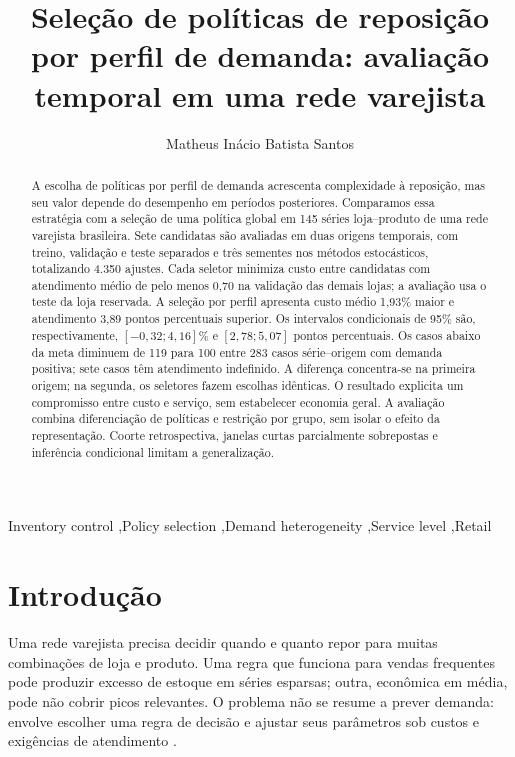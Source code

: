 \documentclass[preprint,12pt]{elsarticle}
\begin{document}
\begin{frontmatter}
\title{Seleção de políticas de reposição por perfil de demanda: avaliação temporal em uma rede varejista}
\author[ufal]{Matheus Inácio Batista Santos}
\begin{abstract}
A escolha de políticas por perfil de demanda acrescenta complexidade à reposição, mas seu valor depende do desempenho em períodos posteriores. Comparamos essa estratégia com a seleção de uma política global em 145 séries loja--produto de uma rede varejista brasileira. Sete candidatas são avaliadas em duas origens temporais, com treino, validação e teste separados e três sementes nos métodos estocásticos, totalizando 4.350 ajustes. Cada seletor minimiza custo entre candidatas com atendimento médio de pelo menos 0,70 na validação das demais lojas; a avaliação usa o teste da loja reservada. A seleção por perfil apresenta custo médio 1,93\% maior e atendimento 3,89 pontos percentuais superior. Os intervalos condicionais de 95\% são, respectivamente, $[-0{,}32;4{,}16]\%$ e $[2{,}78;5{,}07]$ pontos percentuais. Os casos abaixo da meta diminuem de 119 para 100 entre 283 casos série--origem com demanda positiva; sete casos têm atendimento indefinido. A diferença concentra-se na primeira origem; na segunda, os seletores fazem escolhas idênticas. O resultado explicita um compromisso entre custo e serviço, sem estabelecer economia geral. A avaliação combina diferenciação de políticas e restrição por grupo, sem isolar o efeito da representação. Coorte retrospectiva, janelas curtas parcialmente sobrepostas e inferência condicional limitam a generalização.
\end{abstract}
\begin{keyword}
Inventory control \sep Policy selection \sep Demand heterogeneity \sep Service level \sep Retail
\end{keyword}
\end{frontmatter}

\section{Introdução}
Uma rede varejista precisa decidir quando e quanto repor para muitas combinações de loja e produto. Uma regra que funciona para vendas frequentes pode produzir excesso de estoque em séries esparsas; outra, econômica em média, pode não cobrir picos relevantes. O problema não se resume a prever demanda: envolve escolher uma regra de decisão e ajustar seus parâmetros sob custos e exigências de atendimento \cite{Axsater2006InventoryControl}.
\end{document}
